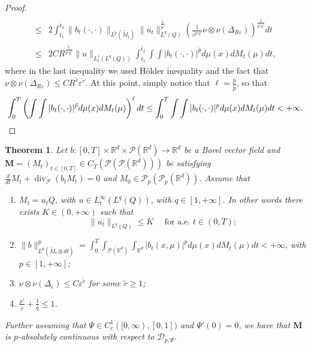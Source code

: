 \documentclass[10pt,leqno]{amsart}
\numberwithin{equation}{section}
\newtheorem{teorema}{Theorem}[section]
\newcommand{\R}{\mathbb{R}}
\newcommand{\Q}{\mathbb{Q}}
\newcommand{\PP}{\mathcal{P}}
\renewcommand{\Q}{Q}
\begin{document}
\begin{proof}
\begin{align*}
        \\
        \leq &
        2 \int_{t_1}^{t_2} \|b_t(\cdot,\cdot)\|_{L^{\tilde{p}}(\widetilde{M}_t)} \|u_t\|_{L^q(Q)}^{\frac{1}{\tilde{p}'}} \left( \frac{1}{\varepsilon^{\tilde{p}'q'}} \nu\otimes \nu (\Delta_{R\varepsilon})\right)^{\frac{1}{\tilde{p}'q'}} dt
        \\
        \leq & 2 CR^{\frac{\tilde{r}}{\tilde{p}'q'}}\|u\|_{L^1_t(L^q(Q))} \int_{t_1}^{t_2} 
        \int \int |b_t(\cdot,\cdot)|^{\tilde{p}} d\mu(x) dM_t(\mu)dt,
    \end{align*}
    where in the last inequality we used H\"older inequality and the fact that $\nu\otimes \nu(\Delta_{R\varepsilon}) \leq CR^{\tilde{r}} \varepsilon^{\tilde{r}}$.
    At this point, simply notice that $\ell = \frac{p}{\tilde{p}}$, so that 
    \[\int_0^T \left(\int \int |b_t(\cdot,\cdot)|^{\tilde{p}} d\mu(x) dM_t(\mu)\right)^\ell dt \leq \int_0^T \int \int |b_t(\cdot,\cdot)|^{p} d\mu(x) dM_t(\mu) dt <+\infty. \qedhere \]
\end{proof}
\fi


\begin{teorema}
	Let $b:[0,T]\times \R^d \times \PP(\R^d)\to \R^d$ be a Borel vector field and $\boldsymbol{M}=(M_t)_{t\in[0,T]}\in C_T(\PP(\PP(\R^d)))$ be satisfying $\frac{d}{dt}M_t + \operatorname{div}_\PP (b_t M_t)=0$ and $M_0 \in \PP_p(\PP_p(\R^d))$.
	Assume that 
	\begin{enumerate}
		\item $M_t = u_t \Q$, with $u \in L^\infty_t(L^q(\Q))$, with $q\in[1,+\infty]$. In other words there exists $K\in (0,+\infty)$ such that
		\begin{equation}
			 \|u_t\|_{L^{q}(\Q)} \leq K \quad \text{ for a.e. }t\in(0,T);
		\end{equation}
		\item $\|b\|_{L^p(\widetilde{M}_t\otimes dt)}^p=\int_0^T \int_{\PP(\R^d)} \int_{\R^d} |b_t(x,\mu)|^p d\mu(x) dM_t(\mu) dt<+\infty$, with $p\in[1,+\infty]$;
		\item $\nu\otimes \nu(\Delta_\varepsilon) \leq C \varepsilon^{\tilde{r}}$ for some $\tilde{r}\geq 1$;
		\item $\frac{p'}{\tilde{r}}+\frac{1}{q}\leq1$.
	\end{enumerate}
	Further assuming that $\Psi\in C_c^1([0,\infty),[0,1])$ and $\Psi'(0) = 0$, we have that $\boldsymbol{M}$ is $p$-absolutely continuous with respect to $\mathcal{D}_{p,\Psi}$. 
\end{teorema}
\end{document}
